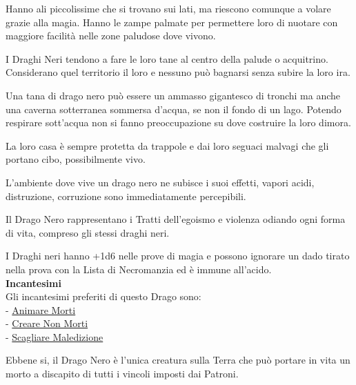 \begin{multicols}{2}
{Hanno ali piccolissime che si trovano sui lati, ma riescono comunque a volare grazie alla magia.
Hanno le zampe palmate per permettere loro di nuotare con maggiore facilità nelle zone paludose dove vivono.

I Draghi Neri tendono a fare le loro tane al centro della palude o acquitrino.
Considerano quel territorio il loro e nessuno può bagnarsi senza subire la loro ira.

Una tana di drago nero può essere un ammasso gigantesco di tronchi ma anche una caverna sotterranea sommersa d'acqua, se non il fondo di un lago.
Potendo respirare sott'acqua non si fanno preoccupazione su dove costruire la loro dimora.

La loro casa è sempre protetta da trappole e dai loro seguaci malvagi che gli portano cibo, possibilmente vivo.

L'ambiente dove vive un drago nero ne subisce i suoi effetti, vapori acidi, distruzione, corruzione sono immediatamente percepibili.

Il Drago Nero rappresentano i Tratti dell'egoismo e violenza odiando ogni forma di vita, compreso gli stessi draghi neri.

I Draghi neri hanno +1d6 nelle prove di magia e possono ignorare un dado tirato nella prova con la Lista di Necromanzia ed è immune all'acido.\\
\textbf{Incantesimi}\\
Gli incantesimi preferiti di questo Drago sono:\\
- \hyperlink{Animare Morti}{Animare Morti}\\
- \hyperlink{Creare Non Morti}{Creare Non Morti}\\
- \hyperlink{Scagliare Maledizione}{Scagliare Maledizione}

Ebbene si, il Drago Nero è l'unica creatura sulla Terra che può portare in vita un morto a discapito di tutti i vincoli imposti dai Patroni.

}
\end{multicols}
